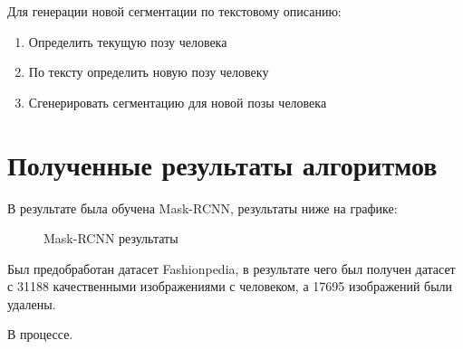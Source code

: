 \documentclass[times,specification,annotation]{itmo-student-thesis}
\begin{document}
Для генерации новой сегментации по текстовому описанию:
\begin{enumerate}
    \item{Определить текущую позу человека}
    \item{По тексту определить новую позу человеку}
    \item{Сгенерировать сегментацию для новой позы человека}
\end{enumerate}

\chapter{Полученные результаты алгоритмов}

В результате была обучена Mask-RCNN, результаты ниже на графике:

\begin{figure}[h]
\caption{Mask-RCNN результаты}
\label{fig:image}
\end{figure}

Был предобработан датасет Fashionpedia, в результате чего был получен датасет с 31188 качественными изображениями с человеком, а 17695 изображений были удалены.

\startconclusionpage

В процессе.

\printmainbibliography

\appendix
\end{document}
